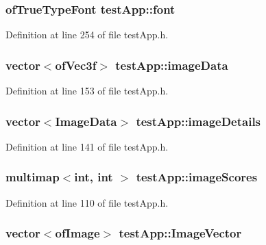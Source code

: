 \hypertarget{classtest_app_a0fdf83c29e178256ee0c1a5b9ee81653}{
\subsubsection[{font}]{\setlength{\rightskip}{0pt plus 5cm}of\-True\-Type\-Font test\-App\-::font}}\label{classtest_app_a0fdf83c29e178256ee0c1a5b9ee81653}


Definition at line 254 of file test\-App.\-h.

\hypertarget{classtest_app_a500cd1228b3364bf30c8fb185e375688}{
\subsubsection[{image\-Data}]{\setlength{\rightskip}{0pt plus 5cm}vector$<$of\-Vec3f$>$ test\-App\-::image\-Data}}\label{classtest_app_a500cd1228b3364bf30c8fb185e375688}


Definition at line 153 of file test\-App.\-h.

\hypertarget{classtest_app_adcd4c3dfc7257326a79e6a3fc8b33406}{
\subsubsection[{image\-Details}]{\setlength{\rightskip}{0pt plus 5cm}vector$<${\bf Image\-Data}$>$ test\-App\-::image\-Details}}\label{classtest_app_adcd4c3dfc7257326a79e6a3fc8b33406}


Definition at line 141 of file test\-App.\-h.

\hypertarget{classtest_app_a9ced1a64554a911109fe8a975b95b590}{
\subsubsection[{image\-Scores}]{\setlength{\rightskip}{0pt plus 5cm}multimap$<$int, int $>$ test\-App\-::image\-Scores}}\label{classtest_app_a9ced1a64554a911109fe8a975b95b590}


Definition at line 110 of file test\-App.\-h.

\hypertarget{classtest_app_ad4de5d6e6e8f3b8bb7424e62792deb1f}{
\subsubsection[{Image\-Vector}]{\setlength{\rightskip}{0pt plus 5cm}vector$<$of\-Image$>$ test\-App\-::\-Image\-Vector}}\label{classtest_app_ad4de5d6e6e8f3b8bb7424e62792deb1f}


